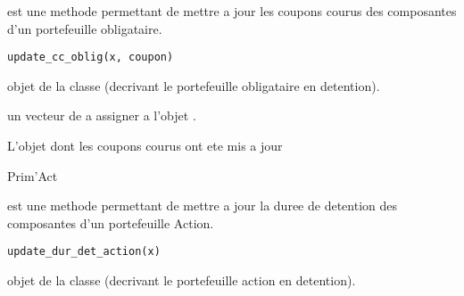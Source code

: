 \documentclass[a4paper]{book}
\begin{document}
%
\begin{Description}\relax
{} est une methode permettant de mettre a jour les coupons courus des composantes d'un portefeuille obligataire.
\end{Description}
%
\begin{Usage}
\begin{verbatim}
update_cc_oblig(x, coupon)
\end{verbatim}
\end{Usage}
%
\begin{Arguments}
\begin{ldescription}
\item[\code{x}] objet de la classe  (decrivant le portefeuille obligataire en detention).

\item[\code{coupon}] un vecteur de  a assigner a l'objet .
\end{ldescription}
\end{Arguments}
%
\begin{Value}
L'objet  dont les coupons courus ont ete mis a jour
\end{Value}
%
\begin{Author}\relax
Prim'Act
\end{Author}
%
\begin{Description}\relax
{} est une methode permettant de mettre a jour la duree de detention des composantes d'un portefeuille Action.
\end{Description}
%
\begin{Usage}
\begin{verbatim}
update_dur_det_action(x)
\end{verbatim}
\end{Usage}
%
\begin{Arguments}
\begin{ldescription}
\item[\code{x}] objet de la classe  (decrivant le portefeuille action en detention).
\end{ldescription}
\end{Arguments}
\end{document}
